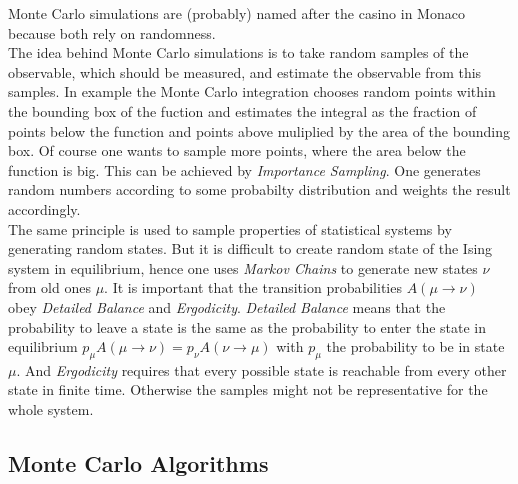 \label{sec:montecarlo}
Monte Carlo simulations are (probably) named after the casino in Monaco
\cite{NewmanBarkema1999} because both rely on randomness.\\
The idea behind Monte Carlo simulations is to take random samples of
the observable, which should be measured, and estimate the observable from
this samples. In example the Monte Carlo integration chooses random
points within the bounding box of the fuction and estimates the integral
as the fraction of points below the function and points above muliplied
by the area of the bounding box.
Of course one wants to sample more points, where the area below the
function is big. This can be achieved by \emph{Importance Sampling}. One
generates random numbers according to some probabilty distribution and
weights the result accordingly.\\
The same principle is used to sample properties of statistical systems
by generating random states.
But it is difficult to create random state of the Ising system in
equilibrium, hence one uses \emph{Markov Chains} to generate new states
\(\nu\) from old ones \(\mu\).
It is important that the transition probabilities \(A(\mu \to \nu)\)
obey \emph{Detailed Balance} and \emph{Ergodicity}.
\emph{Detailed Balance} means  that the probability to leave a state is
the same as the probability to enter the state in equilibrium
\(p_\mu A(\mu \to \nu) = p_\nu A(\nu \to \mu)\) with \(p_\mu\) the
probability to be in state \(\mu\).
And \emph{Ergodicity} requires that every possible state is reachable
from every other state in finite time. \cite{NewmanBarkema1999} \cite{Katzgraber2011}
Otherwise the samples might not be representative for the whole system.\\

\subsection{Monte Carlo Algorithms}

